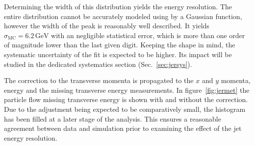 \noindent Determining the width of this distribution yields the energy resolution. The entire distribution cannot be accurately modeled using by a Gaussian function, however the width of the peak is reasonably well described. It yields $\sigma_{\text{MC}} = 6.2\,\text{GeV}$ with an negligible statistical error, which is more than one order of magnitude lower than the last given digit. Keeping the shape in mind, the systematic uncertainty of the fit is expected to be higher. Its impact will be studied in the dedicated systematics section (Sec.~\ref{sec:jersys}).

The correction to the transverse momenta is propagated to the $x$ and $y$ momenta, energy and the missing transverse energy measurements. In figure~\ref{fig:jermet} the particle flow missing transverse energy is shown with and without the correction. Due to the adjustment being expected to be comparatively small, the histogram has been filled at a later stage of the analysis. This ensures a reasonable agreement between data and simulation prior to examining the effect of the jet energy resolution.

